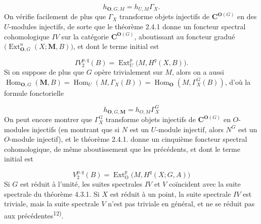\begin{equation}
h_{{\mathbf O},G,M}=h_{U,M}\Gamma_X.
\tag{5.6.5 bis}
\end{equation}
On vérifie facilement de plus que $\Gamma_X$ transforme objets injectifs de
${\mathbf C}^{{\mathbf O}(G)}$ en des $U$-modules injectifs, de sorte que le théorème 2.4.1 donne
un foncteur spectral cohomologique $IV$ sur la catégorie ${\mathbf C}^{{\mathbf O}(G)}$,
aboutissant au foncteur gradué
$\bigl(\operatorname{Ext}_{{\mathbf O},G}^n(X;{\mathbf M},B)\bigr)$, et dont le terme initial est

\begin{equation}
IV_2^{p,q}(B)=\operatorname{Ext}_U^p\bigl(M,H^q(X,B)\bigr).
\tag{5.6.11 bis}
\end{equation}
Si on suppose de plus que $G$ opère trivialement sur $M$, alors on a aussi
$\operatorname{Hom}_{{\mathbf O},G}({\mathbf M},B)=\operatorname{Hom}_U(M,\Gamma_X(B))=\operatorname{Hom}_{{\mathbf O}}(M,\Gamma_X^G(B))$,
d'où la formule fonctorielle

\begin{equation}
h_{{\mathbf O},G,{\mathbf M}}=h_{O,M}\Gamma_X^G
\tag{5.6.5 ter}
\end{equation}
On peut encore montrer que $\Gamma_X^G$ transforme objets injectifs de
${\mathbf C}^{{\mathbf O}(G)}$ en $O$-modules injectifs (en montrant que si $N$ est un $U$-module
injectif, alors $N^G$ est un $O$-module injectif), et le théorème 2.4.1. donne
un cinquième foncteur spectral cohomologique, de même aboutissement que les
précédents, et dont le terme initial est

\begin{equation}
V_2^{p,q}(B)=\operatorname{Ext}_{\mathrm O}^p\bigl(M,H^q(X;G,A)\bigr)
\tag{5.6.11 ter}
\end{equation}
Si $G$ est réduit à l'unité, les suites spectrales $IV$ et $V$ coïncident avec la
suite spectrale du théorème 4.3.1. Si $X$ est réduit à un point, la suite
spectrale $IV$ est triviale, mais la suite spectrale $V$ n'est pas triviale en
général, et ne se réduit pas aux précédentes\textsuperscript{12)}.

